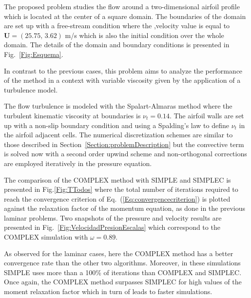 \documentclass[final,3p,times,11pt,onecolumn]{myElsarticle}
\numberwithin{equation}{section}
\begin{document}

The proposed problem studies the flow around a two-dimensional airfoil profile which is located at the center of a square domain. 
The boundaries of the domain are set up with a free-stream  condition where the ,velocity value is equal to $\boldsymbol{U} = (25.75,\, 3.62)$ m/s which is also the initial condition over the whole domain. The details of the domain and boundary conditions is presented in Fig.~\ref{Fig:Esquema}.

In contrast to the previous cases, this problem aims to analyze the performance of the method in a context with variable viscosity given by the application of a turbulence model.

The flow turbulence is modeled with the Spalart-Almaras method where the turbulent kinematic viscosity at boundaries is $\nu_t = 0.14$. The airfoil walls are set up with a non-slip boundary condition and using a Spalding's law to define $\nu_t$ in the airfoil adjacent cells. The numerical discretization schemes are similar to those described in Section~\ref{Section:problemDescription} but the convective term is solved now with a second order upwind scheme and non-orthogonal corrections are employed iteratively in the pressure equation.


The comparison of the COMPLEX method with SIMPLE and SIMPLEC is presented in Fig.\ref{Fig:TTodos} where the total number of iterations required to reach the convergence criterion of Eq.~(\ref{Eq:convergencecriterion}) is plotted against the relaxation factor of the momentum equation, as done in the previous laminar problems.  Two snapshots of the pressure and velocity results are presented in Fig.~\ref{Fig:VelocidadPresionEscalas} which correspond to the COMPLEX simulation with $\omega = 0.89$.

As observed for the laminar cases, here the COMPLEX method has a better convergence rate than the other two algorithms. Moreover, in these simulations SIMPLE uses more than a 100\% of iterations than COMPLEX and SIMPLEC. Once again, the COMPLEX method surpasses SIMPLEC for high values of the moment relaxation factor which in turn of leads to faster simulations.
\end{document}
